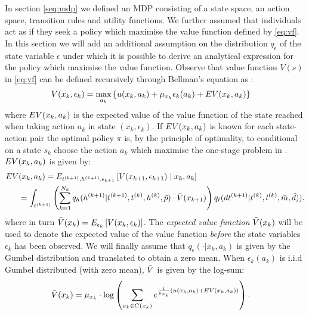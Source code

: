 In section \ref{seq:mdp} we defined an MDP consisting of a state space, an action space, transition rules and utility functions. We further assumed that individuals act as if they seek a policy which maximise the value function defined by \eqref{eq:vf}. In this section we will add an additional assumption on the distribution $q_\epsilon$ of the state variable $\epsilon$ under which it is possible to derive an analytical expression for the policy which maximise the value function. Observe that value function $V(s)$ in \eqref{eq:vf} can be defined recursively through Bellman's equation as \citep{bellman,Rust87}:
\begin{equation} \label{eq:vfbellman}
\begin{aligned}
V(x_k,\epsilon_k) &= \max_{a_k} \left\{\avgu(x_k,a_k) + \mu_{x_k}\epsilon_k(a_k)+ \eutil(x_k,a_k) \right\} 
\end{aligned}
\end{equation}
where $EV(x_k,a_k) $ is the expected value of the value function of the state reached when taking action $a_k$ in state $(x_k,\epsilon_k)$. If $EV(x_k,a_k)$ is known for each state-action pair the optimal policy $\pi$ is, by the principle of optimality, to conditional on a state $s_k$ choose the action $a_k$ which maximise the one-stage problem in . $EV(x_k,a_k) $ is given by: 
\begin{equation}
\begin{aligned}
	\eutil&(x_k,a_k)  = E_{t\ks{k+1},\amem\ks{k+1},\epsilon_{k+1}}\left[ V(x_{k+1},\epsilon_{k+1}) \mid x_k,a_k \right] \\
	&= \int_{t\ks{k+1}} \left( \sum_{k=1}^{N_{\amem}}q_\amem(\amem\ks{k+1}|t\ks{k+1}, t\ks{k},\amem\ks{k},\act{p}) \cdot \ev(x_{k+1}) \right)q_t(dt\ks{k+1}|t\ks{k},l\ks{k},\act{m},\act{d})).
	\end{aligned}
\end{equation}
where in turn $\bar{V}(x_k) = E_{\epsilon_k} \left[ V(x_k,\epsilon_k) \right]$.
The \emph{expected value function} $\bar{V}(x_k)$ will be used to denote the expected value of the value function \emph{before} the state variables $\epsilon_k$ has been observed.  We will finally assume that $q_\epsilon(\cdot|x_k,a_k)$ is given by the Gumbel distribution and translated to obtain a zero mean. When $\epsilon_k(a_k)$ is i.i.d Gumbel distributed (with zero mean), $\bar{V}$ is given by the log-sum:
\begin{equation} \label{eq:evfbellman}
\begin{aligned}
\ev(x_k) &= %
\mu_{x_k}\cdot\log\left(\sum_{a_k\in C(x_{k})} e^{\frac{1}{\mu_{x_k}}\left(\avgu(x_k,a_k) + \eutil(x_k,a_k)\right)}\right).
\end{aligned}
\end{equation}
